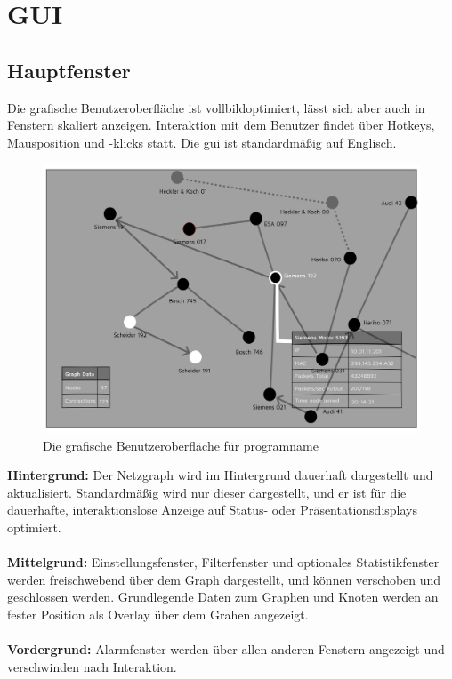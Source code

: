 \chapter{GUI}

\section{Hauptfenster}
Die grafische Benutzeroberfläche ist vollbildoptimiert, lässt sich aber auch in
Fenstern skaliert anzeigen. Interaktion mit dem Benutzer findet über Hotkeys,
Mausposition und -klicks statt.
Die \gls{gui} ist standardmäßig auf Englisch.

  \begin{figure}[h!]
    \hspace*{0.15cm}\includegraphics[scale=0.07]{./img/GUI.png}
    \caption{Die grafische Benutzeroberfläche für \gls{programname}}
  \end{figure}

\noindent \textbf{Hintergrund:} Der Netzgraph wird im Hintergrund dauerhaft dargestellt und
aktualisiert. Standardmäßig wird nur dieser dargestellt, und er ist für die
dauerhafte, interaktionslose Anzeige auf Status- oder Präsentationsdisplays
optimiert.
\\ \\
\textbf{Mittelgrund:} Einstellungsfenster, Filterfenster und optionales Statistikfenster
werden freischwebend über dem Graph dargestellt, und können verschoben und
geschlossen werden. Grundlegende Daten zum Graphen und Knoten werden an fester
Position als Overlay über dem Grahen angezeigt.
\\ \\
\textbf{Vordergrund:} Alarmfenster werden über allen anderen Fenstern angezeigt und
verschwinden nach Interaktion.

